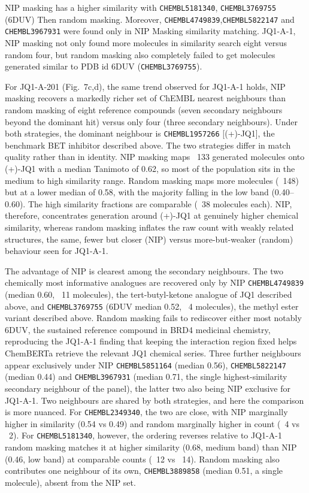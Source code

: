 \documentclass[a4paper,12pt]{article}
\begin{document}
NIP masking has a higher similarity with
\texttt{CHEMBL5181340}, \texttt{CHEMBL3769755}
(6DUV) Then random masking.     Moreover,  \texttt{CHEMBL4749839},\texttt{CHEMBL5822147} and \texttt{CHEMBL3967931} were found only in NIP Masking similarity matching.
JQ1-A-1, NIP masking not only found more molecules in similarity search eight versus random four, but random masking also completely failed to get molecules generated similar to PDB id 6DUV (\texttt{CHEMBL3769755}).

For JQ1-A-201 (Fig.~7c,d), the same trend observed for JQ1-A-1 holds, NIP masking recovers a markedly richer set of ChEMBL nearest neighbours than random masking of eight reference compounds (seven secondary neighbours beyond the dominant hit) versus only four (three secondary neighbours).
Under both strategies, the dominant neighbour is \texttt{CHEMBL1957266} [(+)-JQ1], the benchmark BET inhibitor described above. The two strategies differ in match quality rather than in identity. NIP masking maps ~133 generated molecules onto (+)-JQ1 with a median Tanimoto of 0.62, so most of the population sits in the medium to high similarity range. Random masking maps more molecules (~148) but at a lower median of 0.58, with the majority falling in the low band (0.40–0.60). The high similarity fractions are comparable (~38 molecules each). NIP, therefore, concentrates generation around (+)-JQ1 at genuinely higher chemical similarity, whereas random masking inflates the raw count with weakly related structures, the same, fewer but closer (NIP) versus more-but-weaker (random) behaviour seen for JQ1-A-1.

The advantage of NIP is clearest among the secondary neighbours. The two chemically most informative analogues are recovered only by NIP \texttt{CHEMBL4749839} (median 0.60, ~11 molecules), the tert-butyl-ketone analogue of JQ1 described above, and \texttt{CHEMBL3769755} (6DUV median 0.52, ~4 molecules), the methyl ester variant described above. Random masking fails to rediscover either most notably 6DUV, the sustained reference compound in BRD4 medicinal chemistry, reproducing the JQ1-A-1 finding that keeping the interaction region fixed helps ChemBERTa retrieve the relevant JQ1 chemical series. Three further neighbours appear exclusively under NIP \texttt{CHEMBL5851164} (median 0.56), \texttt{CHEMBL5822147} (median 0.44) and \texttt{CHEMBL3967931} (median 0.71, the single highest-similarity secondary neighbour of the panel), the latter two also being NIP exclusive for JQ1-A-1.
Two neighbours are shared by both strategies, and here the comparison is more nuanced. For \texttt{CHEMBL2349340}, the two are close, with NIP marginally higher in similarity (0.54 vs 0.49) and random marginally higher in count (~4 vs ~2). For \texttt{CHEMBL5181340}, however, the ordering reverses relative to JQ1-A-1 random masking matches it at higher similarity (0.68, medium band) than NIP (0.46, low band) at comparable counts (~12 vs ~14). Random masking also contributes one neighbour of its own, \texttt{CHEMBL3889858} (median 0.51, a single molecule), absent from the NIP set.
\end{document}
